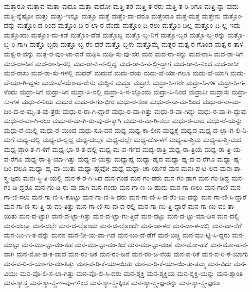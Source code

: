 {ಮತ್ತಾರೂ
ಮತ್ತಾವ
ಮತ್ತಾ-ವುದೂ
ಮತ್ತಾ-ವುದೋ
ಮತ್ತಿ-ತರ
ಮತ್ತಿ-ತ-ರರು
ಮತ್ತಿ-ತ-ರಿ-ರಿಗೂ
ಮತ್ತಿ-ನ್ನಾ-ವುದು
ಮತ್ತಿ-ನ್ನೆಷ್ಟೋ
ಮತ್ತು
ಮತ್ತು-ಇನ್ನೂ
ಮತ್ತೂ
ಮತ್ತೆ
ಮತ್ತೆಂ-ದಾ-ದರೂ
ಮತ್ತೆಂದೂ
ಮತ್ತೆ-ಮತ್ತೆ
ಮತ್ತೇನು
ಮತ್ತೊಂ-ದನ್ನು
ಮತ್ತೊಂ-ದ-ರಿಂದ
ಮತ್ತೊಂ-ದಿ-ರ-ಲಾ-ರ-ದೆಂದು
ಮತ್ತೊಂ-ದಿ-ರಲು
ಮತ್ತೊಂ-ದಿಲ್ಲ
ಮತ್ತೊಂ-ದಿ-ಲ್ಲ-ಇದು
ಮತ್ತೊಂದು
ಮತ್ತೊಂ-ದು-ಕಡೆ
ಮತ್ತೊಂ-ದೆಡೆ
ಮತ್ತೊಬ್ಬ
ಮತ್ತೊ-ಬ್ಬ-ನಿಗೆ
ಮತ್ತೊ-ಬ್ಬರ
ಮತ್ತೊ-ಬ್ಬ-ರನ್ನು
ಮತ್ತೊ-ಬ್ಬ-ರಿ-ಗಾಗಿ
ಮತ್ತೊ-ಬ್ಬರು
ಮತ್ತೊ-ಬ್ಬ-ರೆಂ-ದರೆ
ಮತ್ತೊ-ಬ್ಬಳು
ಮತ್ತೊಮ್ಮೆ
ಮತ್ಸರ
ಮತ್ಸ-ರ-ಗೊಂಡ
ಮತ್ಸ-ರ-ತಾಳಿ
ಮತ್ಸ-ರ-ವನ್ನು
ಮತ್ಸ-ರ-ವುಂ-ಟಾ-ದರೆ
ಮಥಿಸಿ
ಮಥಿ-ಸು-ವು-ದರ
ಮದ
ಮದ-ರಾ-ಸನ್ನು
ಮದ-ರಾಸಿ
ಮದ-ರಾ-ಸಿಗೆ
ಮದ-ರಾ-ಸಿನ
ಮದ-ರಾ-ಸಿ-ನಲ್ಲಿ
ಮದ-ರಾ-ಸಿ-ನ-ಲ್ಲಿದ್ದ
ಮದ-ರಾ-ಸಿ-ನ-ಲ್ಲಿ-ದ್ದಾಗ
ಮದ-ರಾ-ಸಿ-ನಿಂದ
ಮದ-ರಾಸೀ
ಮದ-ರಾಸು
ಮದ-ರಾ-ಸು-ಗಳಲ್ಲಿ
ಮದರ್
ಮದುವೆ
ಮದು-ವೆಯ
ಮದು-ವೆ-ಯಾ-ಗಲೂ
ಮದು-ವೆ-ಯಾಗಿ
ಮದು-ವೆ-ಯಾ-ಗಿ-ದ್ದಳು
ಮದು-ವೆ-ಯೆಂ-ದ-ರೇನು
ಮದ್ದಿನ
ಮದ್ದೂ
ಮದ್ರಾಸಿ
ಮದ್ರಾ-ಸಿ-ಗರೇ
ಮದ್ರಾ-ಸಿ-ಗಳ
ಮದ್ರಾ-ಸಿ-ಗ-ಳೆಂದು
ಮದ್ರಾ-ಸಿಗೆ
ಮದ್ರಾ-ಸಿನ
ಮದ್ರಾ-ಸಿ-ನಲ್ಲಿ
ಮದ್ರಾ-ಸಿ-ನ-ಲ್ಲೊಂದು
ಮದ್ರಾ-ಸಿ-ನಿಂದ
ಮದ್ರಾಸೀ
ಮದ್ರಾಸು
ಮದ್ರಾ-ಸು-ಗಳ
ಮಧು-ಕ-ರಿಯ
ಮಧುರ
ಮಧು-ರ-ಗಂ-ಭೀರ
ಮಧು-ರ-ಕಂಠ
ಮಧು-ರ-ನಾ-ಮ-ದಿಂದ
ಮಧು-ರ-ನಾ-ಮ-ದಿಂ-ದ-ಅ-ಮೃ-ತ-ಪು-ತ್ರರು
ಮಧು-ರ-ರಾ-ಗಿ-ದ್ದಾರೆ
ಮಧು-ರ-ವಾ-ಗಿತ್ತು
ಮಧು-ರ-ವಾ-ಗಿದ್ದು
ಮಧು-ರ-ವಾ-ಗಿ-ದ್ದುವು
ಮಧು-ರ-ವಾ-ಗಿ-ರಲು
ಮಧು-ರ-ವಾ-ಗಿ-ರು-ವು-ದ-ಕ್ಕಾಗಿ
ಮಧು-ರ-ವಾ-ಗಿ-ಸಲು
ಮಧು-ರ-ವಾದ
ಮಧು-ರೆ-ಯನ್ನು
ಮಧು-ರೆ-ಯಲ್ಲಿ
ಮಧು-ರೆ-ಯಿಂದ
ಮಧು-ಸೂ-ದನ
ಮಧ್ಯ
ಮಧ್ಯ-ಕಾ-ಲೀನ
ಮಧ್ಯಕ್ಕೆ
ಮಧ್ಯದ
ಮಧ್ಯ-ದ-ಲ್ಲಾ-ಗ-ಲಿ-ನಿ-ಮಗೆ
ಮಧ್ಯ-ದಲ್ಲಿ
ಮಧ್ಯ-ದ-ಲ್ಲಿದ್ದ
ಮಧ್ಯ-ದಲ್ಲೂ
ಮಧ್ಯ-ದಲ್ಲೇ
ಮಧ್ಯ-ದೊ-ಳಗೆ
ಮಧ್ಯ-ಪ-ಶ್ಚಿಮ
ಮಧ್ಯ-ಪ-ಶ್ಚಿ-ಮದ
ಮಧ್ಯ-ಪ್ರಾಂ-ತ-ಗ-ಳಿಗೆ
ಮಧ್ಯ-ಭಾ-ರ-ತ-ದಲ್ಲಿ
ಮಧ್ಯ-ಮ-ವ-ರ್ಗದ
ಮಧ್ಯ-ರಾತ್ರಿ
ಮಧ್ಯ-ರಾ-ತ್ರಿಯ
ಮಧ್ಯ-ರಾ-ತ್ರಿ-ಯ-ವ-ರೆಗೂ
ಮಧ್ಯ-ರಾ-ತ್ರಿ-ಯಾ-ಗಿತ್ತು
ಮಧ್ಯ-ವ-ಯಸ್ಸು
ಮಧ್ಯಾಹ್ನ
ಮಧ್ಯಾ-ಹ್ನದ
ಮಧ್ಯಾ-ಹ್ನ-ದ-ವ-ರೆಗೂ
ಮಧ್ಯಾ-ಹ್ನ-ದಿಂ-ದಲೂ
ಮಧ್ಯಾ-ಹ್ನ-ವಾ-ಯಿತು
ಮಧ್ಯಾ-ಹ್ನವೋ
ಮಧ್ಯೆ
ಮಧ್ವಾ-ಚಾ-ರ್ಯರ
ಮನ
ಮನಃ-ಪ-ಟ-ಲದ
ಮನಃ-ಶಾ-ಸ್ತ್ರ-ಜ್ಞರು
ಮನಃ-ಸ್ಥಿ-ತಿ-ಯಲ್ಲಿ
ಮನ-ಕ-ರ-ಗಿ-ಸಿದ
ಮನ-ಗಂಡ
ಮನ-ಗಂ-ಡರು
ಮನ-ಗಂ-ಡಾಗ
ಮನ-ಗಂ-ಡಿದ್ದ
ಮನ-ಗಂ-ಡಿ-ದ್ದರೂ
ಮನ-ಗಂ-ಡಿ-ರು-ವು-ದಾಗಿ
ಮನ-ಗಂಡು
ಮನ-ಗಾ-ಣ-ಬ-ಹುದು
ಮನ-ಗಾ-ಣಲು
ಮನ-ಗಾಣಿ
ಮನ-ಗಾ-ಣಿ-ಸಲು
ಮನ-ಗಾ-ಣಿ-ಸಿ-ಕೊಟ್ಟು
ಮನ-ಗಾ-ಣಿ-ಸಿ-ದರು
ಮನ-ಗಾ-ಣಿ-ಸಿ-ದ-ರೆಂ-ಬು-ದನ್ನು
ಮನ-ಗಾ-ಣಿ-ಸಿ-ದ್ದಾರೆ
ಮನ-ಗಾ-ಣಿ-ಸು-ತ್ತಿ-ರು-ವಂ-ತಿತ್ತು
ಮನ-ಗಾ-ಣಿ-ಸು-ವು-ದ-ರಲ್ಲಿ
ಮನ-ಗಾ-ಣು-ತ್ತಿ-ದ್ದಾರೆ
ಮನ-ಗಾ-ಣು-ವಂ-ತಾ-ಯಿತು
ಮನ-ದ-ಟ್ಟಾಗಿ
ಮನ-ದ-ಟ್ಟಾ-ಗಿತ್ತು
ಮನ-ದ-ಟ್ಟಾ-ಗು-ತ್ತಿದೆ
ಮನ-ದಟ್ಟು
ಮನ-ದ-ಟ್ಟು-ಮಾ-ಡಿಸ
ಮನ-ದಲ್ಲಿ
ಮನ-ದಲ್ಲೂ
ಮನ-ದಲ್ಲೇ
ಮನ-ದ-ಲ್ಲೊಂದು
ಮನ-ದ-ಲ್ಲೊಂದೇ
ಮನ-ದಾ-ಳದ
ಮನ-ದಾ-ಳ-ದಲ್ಲಿ
ಮನ-ದಾ-ಸೆಗೆ
ಮನ-ದಿಂ-ಗಿ-ತ-ವನ್ನು
ಮನನ
ಮನ-ನೀ-ಯ-ವಾ-ಗಿದೆ
ಮನ-ಬಂ-ದೆ-ಡೆಗೆ
ಮನ-ಬಿಚ್ಚಿ
ಮನ-ಮು-ಟ್ಟಿ-ಸಿ-ದ್ದರು
ಮನ-ಮುಟ್ಟು
ಮನ-ಮು-ಟ್ಟು-ವಂ-ತಹ
ಮನ-ಮು-ಟ್ಟು-ವಂ-ತಿದೆ
ಮನ-ಮು-ಟ್ಟು-ವಂತೆ
ಮನ-ಮೋ-ಹಕ
ಮನ-ಮೋ-ಹ-ಕ-ವಾಗಿ
ಮನ-ಮೋ-ಹ-ಕ-ವಾದ
ಮನ-ರಂ-ಜಕ
ಮನ-ರಂ-ಜನೆ
ಮನ-ರಂ-ಜ-ನೆಯ
ಮನ-ವ-ರಿಕೆ
ಮನ-ವ-ರಿ-ಕೆ-ಯಾಗು
ಮನ-ವ-ರಿ-ಕೆ-ಯಾ-ಗು-ವಂ-ತಿತ್ತು
ಮನ-ವ-ರಿ-ಕೆ-ಯಾ-ಯಿತು
ಮನ-ವ-ರಿ-ಕೆ-ಯಾ-ಯಿ-ತು-ತಮ್ಮ
ಮನ-ವಿದು
ಮನ-ವಿಯು
ಮನ-ವೊ-ಲಿ-ಸ-ಲಾ-ಗಿತ್ತು
ಮನ-ವೊ-ಲಿ-ಸಿ-ದರು
ಮನ-ಶ್ಶಕ್ತಿ
ಮನ-ಶ್ಶಕ್ತಿಯ
ಮನ-ಶ್ಶಕ್ತಿ-ಯನ್ನು
ಮನ-ಶ್ಶಾಂತಿ
ಮನ-ಶ್ಶಾಸ್ತ್ರ
ಮನ-ಶ್ಶಾ-ಸ್ತ್ರ-ಇ-ವು-ಗಳಿಂದ
ಮನ-ಶ್ಶಾ-ಸ್ತ್ರ-ಕ್ಕಿಂತ
ಮನ-ಶ್ಶಾ-ಸ್ತ್ರ-ಜ್ಞ-ರನ್ನು
ಮನ-ಶ್ಶಾ-ಸ್ತ್ರ-ಜ್ಞರೂ
}
